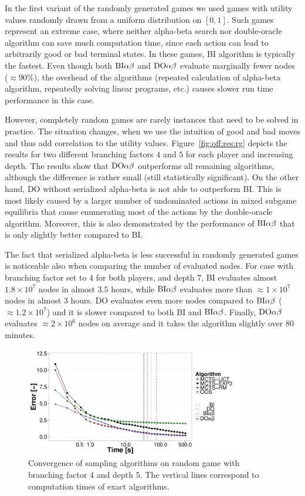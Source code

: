 In the first variant of the randomly generated games we used games with utility values randomly drawn from a uniform distribution on $[0,1]$.
Such games represent an extreme case, where neither alpha-beta search nor double-oracle algorithm can save much computation time, since each action can lead to arbitrarily good or bad terminal states.
In these games, \textsc{BI} algorithm is typically the fastest.
Even though both $\textrm{BI}\alpha\beta$ and $\textrm{DO}\alpha\beta$ evaluate marginally fewer nodes ($\approx90\%$), the overhead of the algorithms (repeated calculation of alpha-beta algorithm, repeatedly solving linear programs, etc.) causes slower run time performance in this case.

However, completely random games are rarely instances that need to be solved in practice.
The situation changes, when we use the intuition of good and bad moves and thus add correlation to the utility values.
Figure~\ref{fig:off:res:rg} depicts the results for two different branching factors $4$ and $5$ for each player and increasing depth.
The results show that $\textrm{DO}\alpha\beta$ outperforms all remaining algorithms, although the difference is rather small (still statistically significant).
On the other hand, \textsc{DO} without serialized alpha-beta is not able to outperform \textsc{BI}.
This is most likely caused by a larger number of undominated actions in mixed subgame equilibria that cause enumerating most of the actions by the double-oracle algorithm.
Moreover, this is also demonstrated by the performance of $\textrm{BI}\alpha\beta$ that is only slightly better compared to \textsc{BI}.

The fact that serialized alpha-beta is less successful in randomly generated games is noticeable also when comparing the number of evaluated nodes.
For case with branching factor set to $4$ for both players, and depth $7$, \textsc{BI} evaluates almost $1.8\times10^7$ nodes in almost $3.5$ hours, while $\textrm{BI}\alpha\beta$ evaluates more than $\approx1\times10^7$ nodes in almost $3$ hours.
\textsc{DO} evaluates even more nodes compared to $\textrm{BI}\alpha\beta$ ($\approx1.2\times10^7$) and it is slower compared to both \textsc{BI} and $\textrm{BI}\alpha\beta$.
Finally, $\textrm{DO}\alpha\beta$ evaluates $\approx2\times10^6$ nodes on average and it takes the algorithm slightly over $80$ minutes. 

\begin{figure}[t!]
\centering
\includegraphics[width=0.85\textwidth]{figures/convergence-rg.pdf}
\caption{Convergence of sampling algorithms on random game with branching factor $4$ and depth $5$. The vertical lines correspond to computation times of exact algorithms.} \label{fig:off:conv:rg}
\end{figure}

